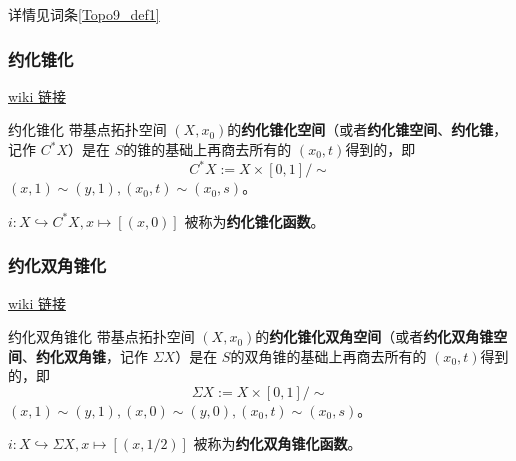 详情见词条\autoref{Topo9_def1}~


\subsubsection{约化锥化}

\href{https://en.wikipedia.org/wiki/Cone_(topology)\#Reduced_cone}{wiki 链接}

\begin{definition}{约化锥化}
带基点拓扑空间 $(X, x_0)$的\textbf{约化锥化空间}（或者\textbf{约化锥空间}、\textbf{约化锥}，记作 $C^* X$）是在 $S$的锥的基础上再商去所有的 $(x_0, t)$得到的，即
\[
    C^* X := X \times [0,1] / \sim
\]
$(x, 1) \sim (y, 1), (x_0, t) \sim (x_0, s)$。

$i: X \hookrightarrow C^* X, x \mapsto [(x, 0)]$ 被称为\textbf{约化锥化函数}。
\end{definition}

\subsubsection{约化双角锥化}

\href{https://en.wikipedia.org/wiki/Suspension_(topology)\#Reduced_suspension}{wiki 链接}

\begin{definition}{约化双角锥化}
带基点拓扑空间 $(X, x_0)$的\textbf{约化锥化双角空间}（或者\textbf{约化双角锥空间}、\textbf{约化双角锥}，记作 $\Sigma X$）是在 $S$的双角锥的基础上再商去所有的 $(x_0, t)$得到的，即
\[
    \Sigma X := X \times [0,1] / \sim
\]
$(x, 1) \sim (y, 1), (x, 0) \sim (y, 0), (x_0, t) \sim (x_0, s)$。

$i: X \hookrightarrow \Sigma X, x \mapsto [(x, 1/2)]$ 被称为\textbf{约化双角锥化函数}。
\end{definition}


